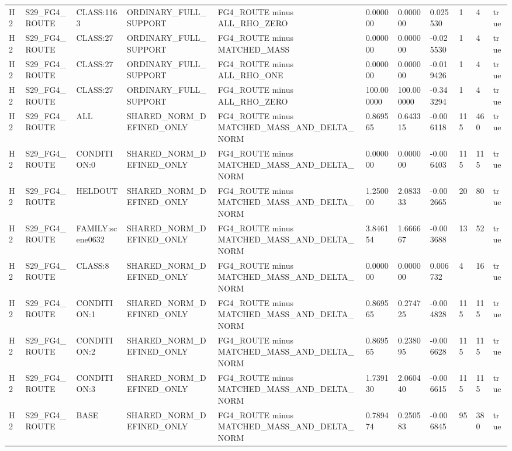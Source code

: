 \begin{tabular}{lllllllllll}
H2 & S29\_FG4\_ROUTE & CLASS:1163 & ORDINARY\_FULL\_SUPPORT & FG4\_ROUTE minus ALL\_RHO\_ZERO & 0.000000 & 0.000000 & 0.025530 & 1 & 4 & true \\
H2 & S29\_FG4\_ROUTE & CLASS:27 & ORDINARY\_FULL\_SUPPORT & FG4\_ROUTE minus MATCHED\_MASS & 0.000000 & 0.000000 & -0.025530 & 1 & 4 & true \\
H2 & S29\_FG4\_ROUTE & CLASS:27 & ORDINARY\_FULL\_SUPPORT & FG4\_ROUTE minus ALL\_RHO\_ONE & 0.000000 & 0.000000 & -0.019426 & 1 & 4 & true \\
H2 & S29\_FG4\_ROUTE & CLASS:27 & ORDINARY\_FULL\_SUPPORT & FG4\_ROUTE minus ALL\_RHO\_ZERO & 100.000000 & 100.000000 & -0.343294 & 1 & 4 & true \\
H2 & S29\_FG4\_ROUTE & ALL & SHARED\_NORM\_DEFINED\_ONLY & FG4\_ROUTE minus MATCHED\_MASS\_AND\_DELTA\_NORM & 0.869565 & 0.643315 & -0.006118 & 115 & 460 & true \\
H2 & S29\_FG4\_ROUTE & CONDITION:0 & SHARED\_NORM\_DEFINED\_ONLY & FG4\_ROUTE minus MATCHED\_MASS\_AND\_DELTA\_NORM & 0.000000 & 0.000000 & -0.006403 & 115 & 115 & true \\
H2 & S29\_FG4\_ROUTE & HELDOUT & SHARED\_NORM\_DEFINED\_ONLY & FG4\_ROUTE minus MATCHED\_MASS\_AND\_DELTA\_NORM & 1.250000 & 2.083333 & -0.002665 & 20 & 80 & true \\
H2 & S29\_FG4\_ROUTE & FAMILY:scene0632 & SHARED\_NORM\_DEFINED\_ONLY & FG4\_ROUTE minus MATCHED\_MASS\_AND\_DELTA\_NORM & 3.846154 & 1.666667 & -0.003688 & 13 & 52 & true \\
H2 & S29\_FG4\_ROUTE & CLASS:8 & SHARED\_NORM\_DEFINED\_ONLY & FG4\_ROUTE minus MATCHED\_MASS\_AND\_DELTA\_NORM & 0.000000 & 0.000000 & 0.006732 & 4 & 16 & true \\
H2 & S29\_FG4\_ROUTE & CONDITION:1 & SHARED\_NORM\_DEFINED\_ONLY & FG4\_ROUTE minus MATCHED\_MASS\_AND\_DELTA\_NORM & 0.869565 & 0.274725 & -0.004828 & 115 & 115 & true \\
H2 & S29\_FG4\_ROUTE & CONDITION:2 & SHARED\_NORM\_DEFINED\_ONLY & FG4\_ROUTE minus MATCHED\_MASS\_AND\_DELTA\_NORM & 0.869565 & 0.238095 & -0.006628 & 115 & 115 & true \\
H2 & S29\_FG4\_ROUTE & CONDITION:3 & SHARED\_NORM\_DEFINED\_ONLY & FG4\_ROUTE minus MATCHED\_MASS\_AND\_DELTA\_NORM & 1.739130 & 2.060440 & -0.006615 & 115 & 115 & true \\
H2 & S29\_FG4\_ROUTE & BASE & SHARED\_NORM\_DEFINED\_ONLY & FG4\_ROUTE minus MATCHED\_MASS\_AND\_DELTA\_NORM & 0.789474 & 0.250583 & -0.006845 & 95 & 380 & true \\

\end{tabular}
